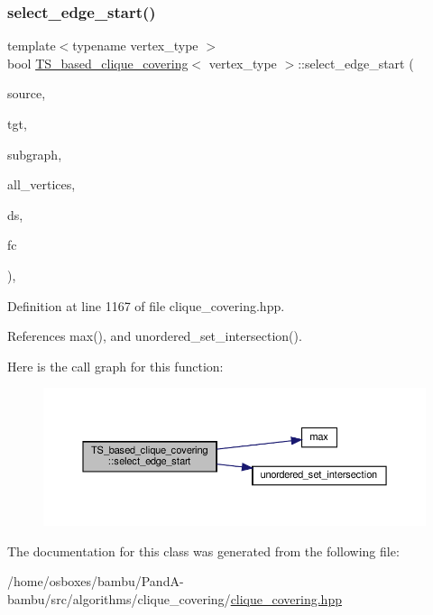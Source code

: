 \subsubsection{\texorpdfstring{select\+\_\+edge\+\_\+start()}{select\_edge\_start()}}
{\footnotesize\ttfamily template$<$typename vertex\+\_\+type $>$ \\
bool \hyperlink{classTS__based__clique__covering}{T\+S\+\_\+based\+\_\+clique\+\_\+covering}$<$ vertex\+\_\+type $>$\+::select\+\_\+edge\+\_\+start (\begin{DoxyParamCaption}\item[{\hyperlink{clique__covering__graph_8hpp_a9cb45047ea8c5ed95a8cfa90494345aa}{C\+\_\+vertex}}]{source,  }\item[{\hyperlink{clique__covering__graph_8hpp_a9cb45047ea8c5ed95a8cfa90494345aa}{C\+\_\+vertex} \&}]{tgt,  }\item[{const \hyperlink{clique__covering__graph_8hpp_aa88e9419fe776ef37020cacd507cc4ad}{cc\+\_\+compatibility\+\_\+graph} \&}]{subgraph,  }\item[{const \hyperlink{classCustomUnorderedSet}{Custom\+Unordered\+Set}$<$ \hyperlink{clique__covering__graph_8hpp_a9cb45047ea8c5ed95a8cfa90494345aa}{C\+\_\+vertex} $>$ \&}]{all\+\_\+vertices,  }\item[{typename boost\+::disjoint\+\_\+sets$<$ \hyperlink{clique__covering__graph_8hpp_af170aff46b9e4328f1ad9b119cf78b4a}{rank\+\_\+pmap\+\_\+type}, \hyperlink{clique__covering__graph_8hpp_af4c454ac367cfb12e29c98e6bc942a06}{pred\+\_\+pmap\+\_\+type} $>$ \&}]{ds,  }\item[{const \hyperlink{structfilter__clique}{filter\+\_\+clique}$<$ vertex\+\_\+type $>$ \&}]{fc }\end{DoxyParamCaption})\hspace{0.3cm}{\ttfamily [inline]}, {\ttfamily [private]}}



Definition at line 1167 of file clique\+\_\+covering.\+hpp.



References max(), and unordered\+\_\+set\+\_\+intersection().

Here is the call graph for this function\+:
\nopagebreak
\begin{figure}[H]
\begin{center}
\leavevmode
\includegraphics[width=350pt]{d1/d29/classTS__based__clique__covering_a72ac374b2e8dd3f983fdecff9eb65aa3_cgraph}
\end{center}
\end{figure}


The documentation for this class was generated from the following file\+:\begin{DoxyCompactItemize}
\item 
/home/osboxes/bambu/\+Pand\+A-\/bambu/src/algorithms/clique\+\_\+covering/\hyperlink{clique__covering_8hpp}{clique\+\_\+covering.\+hpp}\end{DoxyCompactItemize}
